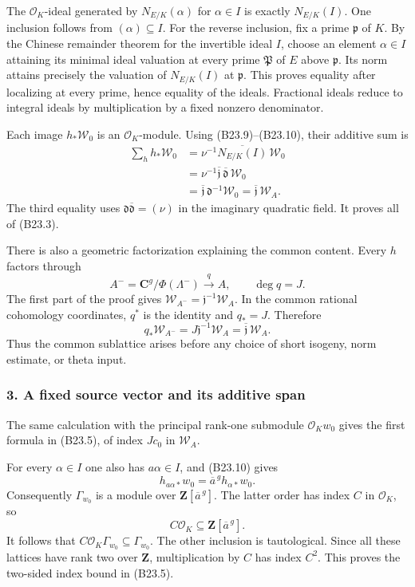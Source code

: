 The \(\mathcal O_K\)-ideal generated by \(N_{E/K}(\alpha)\) for \(\alpha\in I\) is exactly \(N_{E/K}(I)\). One inclusion follows from \((\alpha)\subseteq I\). For the reverse inclusion, fix a prime \(\mathfrak p\) of \(K\). By the Chinese remainder theorem for the invertible ideal \(I\), choose an element \(\alpha\in I\) attaining its minimal ideal valuation at every prime \(\mathfrak P\) of \(E\) above \(\mathfrak p\). Its norm attains precisely the valuation of \(N_{E/K}(I)\) at \(\mathfrak p\). This proves equality after localizing at every prime, hence equality of the ideals. Fractional ideals reduce to integral ideals by multiplication by a fixed nonzero denominator.

Each image \(h_*\mathscr W_0\) is an \(\mathcal O_K\)-module. Using (B23.9)--(B23.10), their additive sum is \[
 \begin{aligned}
 \sum_hh_*\mathscr W_0
 &=\nu^{-1}\overline{N_{E/K}(I)}\,\mathscr W_0\\
 &=\nu^{-1}\overline{\mathfrak j}\,\overline{\mathfrak d}\,\mathscr W_0\\
 &=\overline{\mathfrak j}\,\mathfrak d^{-1}\mathscr W_0
 =\overline{\mathfrak j}\,\mathscr W_A.
 \end{aligned}
\tag{B23.11}
\] The third equality uses \(\mathfrak d\overline{\mathfrak d}=(\nu)\) in the imaginary quadratic field. It proves all of (B23.3).

There is also a geometric factorization explaining the common content. Every \(h\) factors through \[
 A^-=\mathbf C^g/\Phi(\Lambda^-)
 \xrightarrow{q}A,
 \qquad\deg q=J.
\] The first part of the proof gives \(\mathscr W_{A^-}=\mathfrak j^{-1}\mathscr W_A\). In the common rational cohomology coordinates, \(q^*\) is the identity and \(q_*=J\). Therefore \[
 q_*\mathscr W_{A^-}=J\mathfrak j^{-1}\mathscr W_A
 =\overline{\mathfrak j}\,\mathscr W_A.
\tag{B23.12}
\] Thus the common sublattice arises before any choice of short isogeny, norm estimate, or theta input.

\subsubsection{3. A fixed source vector and its additive span}\label{a-fixed-source-vector-and-its-additive-span}

The same calculation with the principal rank-one submodule \(\mathcal O_Kw_0\) gives the first formula in (B23.5), of index \(Jc_0\) in \(\mathscr W_A\).

For every \(\alpha\in I\) one also has \(a\alpha\in I\), and (B23.10) gives \[
 h_{a\alpha*}w_0=\overline a^{\,g}h_{\alpha*}w_0.
\] Consequently \(\Gamma_{w_0}\) is a module over \(\mathbf Z[\overline a^{\,g}]\). The latter order has index \(C\) in \(\mathcal O_K\), so \[
 C\mathcal O_K\subseteq\mathbf Z[\overline a^{\,g}].
\] It follows that \(C\mathcal O_K\Gamma_{w_0}\subseteq\Gamma_{w_0}\). The other inclusion is tautological. Since all these lattices have rank two over \(\mathbf Z\), multiplication by \(C\) has index \(C^2\). This proves the two-sided index bound in (B23.5).

